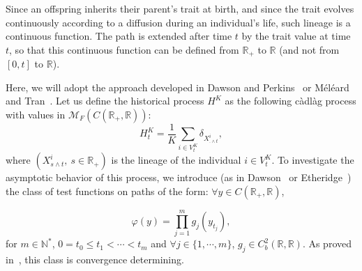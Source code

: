 \documentclass[AHL,Unicode,longabstracts,published]{cedram}
\newcommand{\Mo}{\mathcal{M}}
\newcommand*\N{\mathbb{N}}
\newcommand*\R{\mathbb{R}}
\let\oldforall\forall
\renewcommand*{\forall}{\mathrel{\oldforall}}
\begin{document}
Since an offspring inherits their parent's trait at birth, and since the trait evolves continuously according to a diffusion during an individual's life, such lineage is a continuous function. The path is extended after time $t$ by the trait value at time $t$, so that this continuous function can be defined from $\R_+$ to $\R$ (and not from $[0,t]$ to $\R$).


Here, we will adopt the approach developed in Dawson and Perkins~\cite{dawsonperkinsAMS} or Méléard and Tran~\cite{meleardtran_suphist}. Let us define the historical process $H^K$ as the following càdlàg process with values in $\Mo_F(C(\R_+,\R))$:
\begin{equation}\label{def:HKt}
H^K_t=\frac{1}{K} \sum_{i \in V^K_t} \delta_{X^i_{.\wedge t}},
\end{equation}
where $(X^i_{s\wedge t},\ s\in \R_+)$ is the lineage of the individual $i\in V^K_t$. To investigate the asymptotic behavior of this process, we introduce (as in Dawson~\cite{dawson} or Etheridge~\cite{etheridgebook}) the class of test functions on paths of the form: $\forall y\in C(\R_+,\R)$,

\begin{equation}\label{test-function}
\varphi(y) = \prod_{j=1}^m g_{j}\left(y_{t_{j}}\right),
\end{equation}
for $m\in \N^*$, $0=t_0\le t_{1}<\cdots <t_{m}$ and $\forall j \in \{1,\cdots,m\}$, $g_{j}\in C^2_{b}(\R, \R)$. As proved in~\cite{dawson}, this class is convergence determining.
\end{document}
